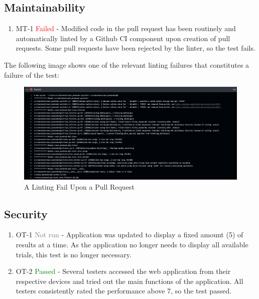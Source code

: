 \documentclass[12pt, titlepage]{article}
\begin{document}
\subsection{Maintainability}
\begin{enumerate}
  \item MT-1 \textcolor{red}{Failed} - Modified code in the pull request has been routinely and automatically linted by a Github CI component upon creation of pull requests. Some pull requests have been rejected by the linter, so the test fails.
\end{enumerate}

\noindent The following image shows one of the relevant linting failures that constitutes a failure of the test:

\begin{figure}[H]
  \centering
  \includegraphics[width=1\linewidth]{images/LintFailure.png}
  \caption{A Linting Fail Upon a Pull Request}
  \label{fig:figure2}
\end{figure}

\subsection{Security}
\begin{enumerate}
  \item OT-1 \textcolor{gray}{Not run} - Application was updated to display a fixed amount (5) of results at a time. As the application no longer needs to display all available trials, this test is no longer necessary.
  \item OT-2 \textcolor{green}{Passed} - Several testers accessed the web application from their respective devices and tried out the main functions of the application. All testers consistently rated the performance above 7, so the test passed.
\end{enumerate}
\end{document}
